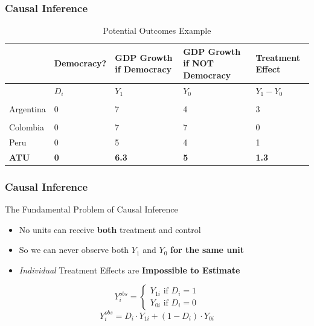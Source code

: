 \documentclass[xcolor=x11names,compress]{beamer}\usepackage[]{graphicx}\usepackage[]{color}
\renewcommand{\(}{\begin{columns}}
\renewcommand{\)}{\end{columns}}
\newcommand{\<}[1]{\begin{column}{#1}}
\renewcommand{\>}{\end{column}}
\begin{document}
\begin{frame}
\frametitle{Causal Inference}
\footnotesize
\begin{table}[htbp]
  \centering
  \caption{Potential Outcomes Example}
    \begin{tabular}{|p{1.8cm}|p{1.8cm}|p{2cm}|p{2cm}|p{2cm}|}
    \hline
          & \multicolumn{1}{p{1.8cm}|}{Democracy?} & \multicolumn{1}{p{2cm}|}{GDP Growth if Democracy} & \multicolumn{1}{p{2.2cm}|}{GDP Growth if NOT Democracy} &  Treatment Effect \bigstrut\\
    \hline
          & \multicolumn{1}{p{1.8cm}|}{$D_i$} & \multicolumn{1}{p{2cm}|}{$Y_1$} & \multicolumn{1}{p{2.2cm}|}{$Y_0$} & \multicolumn{1}{p{1.8cm}|}{$Y_{1} - Y_{0}$} \bigstrut\\
    \hline
     &  &      &       &  \bigstrut\\[-2ex]
    \hline
    Argentina & 0 & 7    & 4      & 3 \bigstrut\\
    \hline
     &  &      &      &  \bigstrut\\[-2ex]
    \hline
    Colombia & 0 &  7   & 7    & 0 \bigstrut\\
    \hline
    Peru & 0 & 5     & 4     & 1 \bigstrut\\
    \hline
    \textbf{ATU} & \textbf{0} & \textbf{6.3}     & \textbf{5}     & \textbf{1.3} \bigstrut\\
\hline
    \end{tabular}%
  \label{tab:addlabel}%
\end{table}%
\normalsize
\end{frame}

\begin{frame}
\frametitle{Causal Inference}
\begin{block}{The Fundamental Problem of Causal Inference}
\begin{itemize}
\item No units can receive \textbf{both} treatment and control
\pause
\item So we can never observe both $Y_1$ and $Y_0$ \textbf{for the same unit}
\pause
\item \textit{Individual} Treatment Effects are \textbf{Impossible to Estimate}
\end{itemize}
\end{block}
\pause
\[
Y_{i}^{obs} = 
\begin{cases}
Y_{1i} \text{ if } D_i=1 \\
Y_{0i} \text{ if } D_i=0
\end{cases}
\]
\pause
$$Y_{i}^{obs} = D_i \cdot Y_{1i} + (1-D_i) \cdot Y_{0i}$$
\end{frame}
\end{document}
